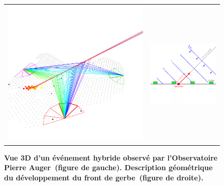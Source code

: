 \documentclass[10pt,a4paper,twoside]{report}
\begin{document}
\begin{figure}
  \centering
  \begin{tabular}{cc}
    \includegraphics[scale=0.4]{./plot/AugerEvent_200812301774}&
    \includegraphics[scale=0.8]{./plot/planeFront}
  \end{tabular}
  \caption{\textbf{\label{fig::rec}Vue 3D d'un événement hybride observé par
      l'Observatoire Pierre Auger~(figure de gauche). Description
      géométrique du développement du front de gerbe~(figure de droite).}}
\end{figure}
\end{document}
